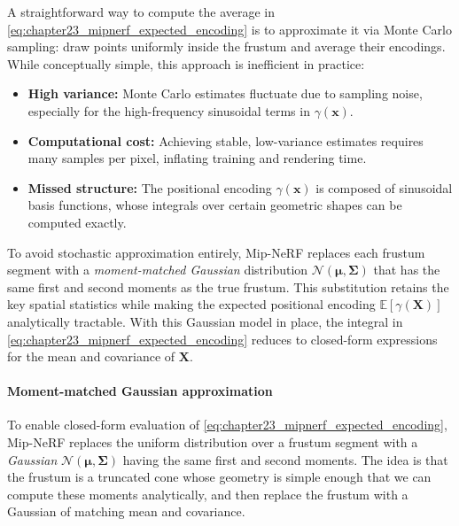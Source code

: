 \begin{enrichment}
\begin{enrichment}
    A straightforward way to compute the average in \eqref{eq:chapter23_mipnerf_expected_encoding} is to approximate it via Monte Carlo sampling: draw points uniformly inside the frustum and average their encodings.  
    While conceptually simple, this approach is inefficient in practice:
    \begin{itemize}
        \item \textbf{High variance:} Monte Carlo estimates fluctuate due to sampling noise, especially for the high-frequency sinusoidal terms in \(\gamma(\mathbf{x})\).
        \item \textbf{Computational cost:} Achieving stable, low-variance estimates requires many samples per pixel, inflating training and rendering time.
        \item \textbf{Missed structure:} The positional encoding \(\gamma(\mathbf{x})\) is composed of sinusoidal basis functions, whose integrals over certain geometric shapes can be computed exactly.
    \end{itemize}
    
    To avoid stochastic approximation entirely, Mip-NeRF replaces each frustum segment with a \emph{moment-matched Gaussian} distribution \(\mathcal{N}(\boldsymbol{\mu}, \boldsymbol{\Sigma})\) that has the same first and second moments as the true frustum.  
    This substitution retains the key spatial statistics while making the expected positional encoding \(\mathbb{E}[\gamma(\mathbf{X})]\) analytically tractable.  
    With this Gaussian model in place, the integral in \eqref{eq:chapter23_mipnerf_expected_encoding} reduces to closed-form expressions for the mean and covariance of \(\mathbf{X}\).
    
    \paragraph{Moment-matched Gaussian approximation}  
    To enable closed-form evaluation of \eqref{eq:chapter23_mipnerf_expected_encoding}, Mip-NeRF replaces the uniform distribution over a frustum segment with a \emph{Gaussian} \(\mathcal{N}(\boldsymbol{\mu}, \boldsymbol{\Sigma})\) having the same first and second moments.  
    The idea is that the frustum is a truncated cone whose geometry is simple enough that we can compute these moments analytically, and then replace the frustum with a Gaussian of matching mean and covariance.
    

\end{enrichment}
\end{enrichment}
